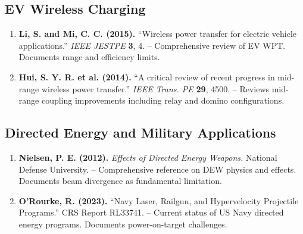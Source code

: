 \documentclass[11pt,a4paper]{article}
\begin{document}
\subsection{EV Wireless Charging}

\begin{enumerate}[resume]
\item \textbf{Li, S. and Mi, C. C. (2015).} ``Wireless power transfer for
electric vehicle applications.'' \textit{IEEE JESTPE} \textbf{3}, 4.
-- Comprehensive review of EV WPT. Documents range and efficiency limits.

\item \textbf{Hui, S. Y. R. et al. (2014).} ``A critical review of recent
progress in mid-range wireless power transfer.'' \textit{IEEE Trans. PE}
\textbf{29}, 4500.
-- Reviews mid-range coupling improvements including relay and
domino configurations.
\end{enumerate}

\subsection{Directed Energy and Military Applications}

\begin{enumerate}[resume]
\item \textbf{Nielsen, P. E. (2012).}
\textit{Effects of Directed Energy Weapons.} National Defense University.
-- Comprehensive reference on DEW physics and effects.
Documents beam divergence as fundamental limitation.

\item \textbf{O'Rourke, R. (2023).} ``Navy Laser, Railgun, and
Hypervelocity Projectile Programs.'' CRS Report RL33741.
-- Current status of US Navy directed energy programs.
Documents power-on-target challenges.
\end{enumerate}
\end{document}
